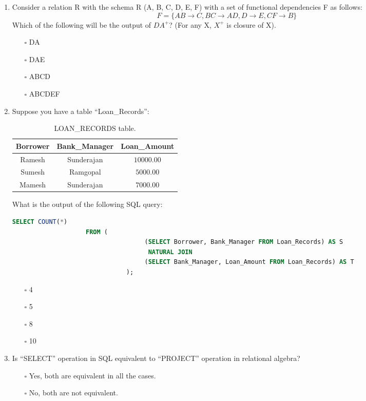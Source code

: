 \documentclass[10pt]{article}
\newcommand{\lightrule}{%
	\arrayrulecolor{black!30}%
	\midrule[\lightrulewidth]%
	\arrayrulecolor{black}}
\begin{document}
\begin{enumerate}
			\item Consider a relation R with the schema R (A, B, C, D, E, F) with a set of functional dependencies F as follows: $$F = \{AB \rightarrow C, BC \rightarrow AD, D \rightarrow E, CF \rightarrow B\}$$
			Which of the following will be the output of $DA^+$? (For any X, $X^+$ is closure of X).
				\begin{enumerate}
					\item[$\square$] DA
					\item[$\square$] DAE
					\item[$\square$] ABCD
					\item[$\square$] ABCDEF
				\end{enumerate}

			\newpage

			\item Suppose you have a table “Loan\_Records”:
				\begin{table}[H]
					\centering
					\begin{tabular}{@{} *{3}{c} @{}}
						\toprule
							\textbf{Borrower} & \textbf{Bank\_Manager} & \textbf{Loan\_Amount} \\
						\midrule
							Ramesh & Sunderajan & $10000.00$ \\ 
						\lightrule
							Sumesh & Ramgopal & $5000.00$ \\ 
						\lightrule
							Mamesh & Sunderajan & $7000.00$ \\ 
						\bottomrule
					\end{tabular}
					\caption{LOAN\_RECORDS table.}
				\end{table}
				What is the output of the following SQL query: 
				\begin{lstlisting}[language=SQL,firstline=1, lastline=6] 
					SELECT COUNT(*) 
					FROM (
								    (SELECT Borrower, Bank_Manager FROM Loan_Records) AS S 
								     NATURAL JOIN 
								    (SELECT Bank_Manager, Loan_Amount FROM Loan_Records) AS T
							   );
				\end{lstlisting}
				\begin{enumerate}
					\item[$\square$] 4
					\item[$\square$] 5
					\item[$\square$] 8
					\item[$\square$] 10
				\end{enumerate}

			\item  Is “SELECT” operation in SQL equivalent to “PROJECT” operation in relational algebra?
				\begin{enumerate}
					\item[$\square$] Yes, both are equivalent in all the cases.
					\item[$\square$] No, both are not equivalent. 
				\end{enumerate}


\end{enumerate}
\end{document}
